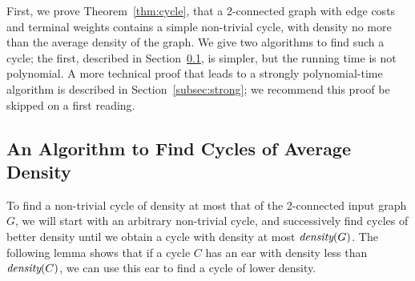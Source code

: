 \documentclass[11pt]{article}
\newcommand{\dens}[1]{\emph{density}(#1)}
\begin{document}
First, we prove Theorem~\ref{thm:cycle}, that a 2-connected graph with
edge costs and terminal weights contains a simple non-trivial cycle,
with density no more than the average density of the graph. We give
two algorithms to find such a cycle; the first, described in
Section~\ref{subsec:nonPoly}, is simpler, but the running time is not
polynomial.  A more technical proof that leads to a strongly
polynomial-time algorithm is described in Section~\ref{subsec:strong};
we recommend this proof be skipped on a first reading.

\subsection{An Algorithm to Find Cycles of Average
  Density}\label{subsec:nonPoly}

To find a non-trivial cycle of density at most that of the 2-connected
input graph $G$, we will start with an arbitrary non-trivial cycle,
and successively find cycles of better density until we obtain a cycle
with density at most $\dens{G}$. The following lemma shows that if a
cycle $C$ has an ear with density less than $\dens{C}$, we can use
this ear to find a cycle of lower density.
\end{document}
